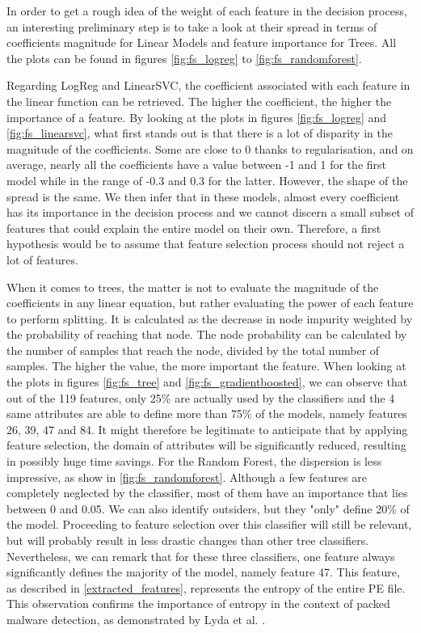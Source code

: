 In order to get a rough idea of the weight of each feature in the decision process, an interesting preliminary step is to take a look at their spread in terms of coefficients magnitude for Linear Models and feature importance for Trees. All the plots can be found in figures \ref{fig:fs_logreg} to \ref{fig:fs_randomforest}.

Regarding LogReg and LinearSVC, the coefficient associated with each feature in the linear function can be retrieved. The higher the coefficient, the higher the importance of a feature. By looking at the plots in figures \ref{fig:fs_logreg} and \ref{fig:fs_linearsvc}, what first stands out is that there is a lot of disparity in the magnitude of the coefficients. Some are close to 0 thanks to regularisation, and on average, nearly all the coefficients have a value between -1 and 1 for the first model while in the range of -0.3 and 0.3 for the latter. However, the shape of the spread is the same. We then infer that in these models, almost every coefficient has its importance in the decision process and we cannot discern a small subset of features that could explain the entire model on their own. Therefore, a first hypothesis would be to assume that feature selection process should not reject a lot of features.

When it comes to trees, the matter is not to evaluate the magnitude of the coefficients in any linear equation, but rather evaluating the power of each feature to perform splitting. It is calculated as the decrease in node impurity weighted by the probability of reaching that node. The node probability can be calculated by the number of samples that reach the node, divided by the total number of samples. The higher the value, the more important the feature. When looking at the plots in figures \ref{fig:fs_tree} and \ref{fig:fs_gradientboosted}, we can observe that out of the 119 features, only 25\% are actually used by the classifiers and the 4 same attributes are able to define more than 75\% of the models, namely features 26, 39, 47 and 84. It might therefore be legitimate to anticipate that by applying feature selection, the domain of attributes will be significantly reduced, resulting in possibly huge time savings. For the Random Forest, the dispersion is less impressive, as show in \autoref{fig:fs_randomforest}. Although a few features are completely neglected by the classifier, most of them have an importance that lies between 0 and 0.05. We can also identify outsiders, but they "only" define 20\% of the model. Proceeding to feature selection over this classifier will still be relevant, but will probably result in less drastic changes than other tree classifiers. Nevertheless, we can remark that for these three classifiers, one feature always significantly defines the majority of the model, namely feature 47. This feature, as described in
\autoref{extracted_features}, represents the entropy of the entire PE file. This observation confirms the importance of entropy in the context of packed malware detection, as demonstrated by Lyda et al. \cite{lyda_using_2007}.

